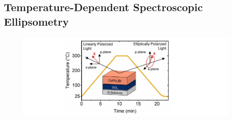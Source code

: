 \subsection{Temperature-Dependent Spectroscopic Ellipsometry}

\begin{figure}[tbp]
  \centering
  \medskip
  \includegraphics[width=.99\textwidth]{chapters/ellipsometry/image/experiment_description.pdf}
  \caption{}
  \label{fig:ellipsometry:experiment_description}
\end{figure}

